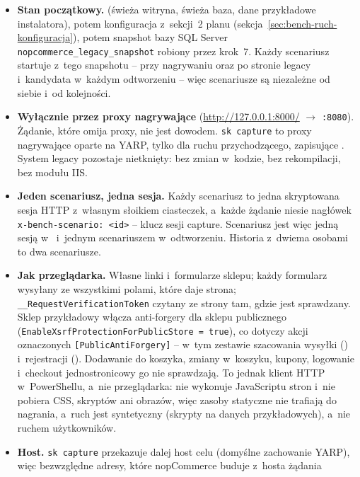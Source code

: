 \begin{itemize}
  \item \textbf{Stan początkowy.}  (świeża witryna,
    świeża baza, dane przykładowe instalatora), potem konfiguracja z~sekcji~2 planu
    (sekcja~\ref{sec:bench-ruch-konfiguracja}), potem snapshot bazy SQL Server
    \texttt{nopcommerce\_legacy\_snapshot} robiony przez krok~7. Każdy scenariusz startuje
    z~tego snapshotu -- przy nagrywaniu oraz po stronie legacy i~kandydata w~każdym
    odtworzeniu -- więc scenariusze są niezależne od siebie i~od kolejności.
  \item \textbf{Wyłącznie przez proxy nagrywające} (\url{http://127.0.0.1:8000/}
    $\rightarrow$ \texttt{:8080}). Żądanie, które omija proxy, nie jest dowodem.
    \texttt{sk capture} to proxy nagrywające oparte na YARP, tylko dla ruchu
    przychodzącego, zapisujące . System legacy pozostaje nietknięty: bez
    zmian w~kodzie, bez rekompilacji, bez modułu IIS.
  \item \textbf{Jeden scenariusz, jedna sesja.} Każdy scenariusz to jedna skryptowana sesja
    HTTP z~własnym słoikiem ciasteczek, a~każde żądanie niesie nagłówek
    \texttt{x-bench-scenario: <id>} -- klucz sesji capture. Scenariusz jest więc jedną
    sesją w~ i~jednym scenariuszem w~odtworzeniu. Historia z~dwiema osobami
    to dwa scenariusze.
  \item \textbf{Jak przeglądarka.} Własne linki i~formularze sklepu; każdy formularz
    wysyłany ze wszystkimi polami, które daje strona; \texttt{\_\_RequestVerificationToken}
    czytany ze strony tam, gdzie jest sprawdzany. Sklep przykładowy włącza anti-forgery dla
    sklepu publicznego (\texttt{EnableXsrfProtectionForPublicStore = true}), co dotyczy
    akcji oznaczonych \texttt{[PublicAntiForgery]} -- w~tym zestawie szacowania wysyłki
    () i~rejestracji
    (). Dodawanie do koszyka, zmiany w~koszyku,
    kupony, logowanie i~checkout jednostronicowy go nie sprawdzają. To jednak klient HTTP
    w~PowerShellu, a~nie przeglądarka: nie wykonuje JavaScriptu stron i~nie pobiera CSS,
    skryptów ani obrazów, więc zasoby statyczne nie trafiają do nagrania, a~ruch jest
    syntetyczny (skrypty na danych przykładowych), a~nie ruchem użytkowników.
  \item \textbf{Host.} \texttt{sk capture} przekazuje dalej host celu (domyślne
    zachowanie YARP), więc bezwzględne adresy, które nopCommerce buduje z~hosta żądania

\end{itemize}

